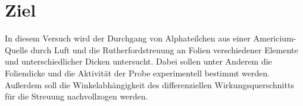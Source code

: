 \section{Ziel}
\label{sec:Ziel}
In diesem Versuch wird der Durchgang von Alphateilchen aus einer Americium-Quelle durch Luft und die Rutherfordstreuung an Folien verschiedener Elemente und unterschiedlicher Dicken untersucht. Dabei sollen unter Anderem die Foliendicke und die Aktivität der Probe experimentell bestimmt werden. Außerdem soll die Winkelabhängigkeit des differenziellen Wirkungsquerschnitts für die Streuung nachvollzogen werden.
